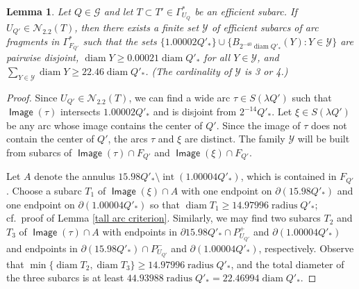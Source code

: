 \documentclass[12pt]{amsart}
\numberwithin{equation}{section}
\theoremstyle{plain}
\newtheorem{lemma}[theorem]{Lemma}
\theoremstyle{definition}
\newcommand{\radius}{\mathop\mathrm{radius}\nolimits}
\newcommand{\diam}{\mathop\mathrm{diam}\nolimits}
\newcommand{\Image}{\mathop\mathsf{Image}\nolimits}
\newcommand{\interior}{\mathop\mathrm{int}\nolimits}
\numberwithin{figure}{section}
\begin{document}
\begin{lemma}\label{N22-geometry} Let $Q\in\mathscr{G}$ and let $T\subset T'\in\Gamma^*_{U_Q}$ be an efficient subarc. If $U_{Q'}\in\mathcal{N}_{2.2}(T)$, then there exists a finite set $\mathcal{Y}$ of efficient subarcs of arc fragments in $\Gamma^*_{F_{Q'}}$ such that the sets $\{1.00002Q'_*\}\cup\{B_{2^{-40}\diam Q'_*}(Y):Y\in\mathcal{Y}\}$ are pairwise disjoint, $\diam Y\geq 0.00021 \diam Q'_*$ for all $Y\in\mathcal{Y}$, and $\sum_{Y\in\mathcal{Y}} \diam Y \geq 22.46\diam Q'_*$. (The cardinality of $\mathcal{Y}$ is 3 or 4.)
\end{lemma}

\begin{proof} Since $U_{Q'}\in\mathcal{N}_{2.2}(T)$, we can find a wide arc $\tau \in S(\lambda Q')$ such that $\Image(\tau)$ intersects $1.00002Q'_*$ and is disjoint from $2^{-14}Q'_*$. Let $\xi\in S(\lambda Q')$ be any arc whose image contains the center of $Q'$. Since the image of $\tau$ does not contain the center of $Q'$, the arcs $\tau$ and $\xi$ are distinct. The family $\mathcal{Y}$ will be built from subarcs of $\Image(\tau)\cap F_{Q'}$ and $\Image(\xi)\cap F_{Q'}$.

Let $A$ denote the annulus $15.98Q'_*\setminus \interior(1.00004Q'_*)$, which is contained in $F_{Q'}$. Choose a subarc $T_1$ of $\Image(\xi)\cap A$ with one endpoint on $\partial(15.98Q'_*)$ and one endpoint on $\partial (1.00004Q'_*)$ so that $\diam T_1\geq 14.97996\radius Q'_*$; cf.~proof of Lemma \ref{tall arc criterion}. Similarly, we may find two subarcs $T_2$ and $T_3$ of $\Image(\tau) \cap A$ with endpoints in $\partial 15.98Q'_* \cap P_{U_{Q'}}^+$ and $\partial(1.00004Q'_*)$ and endpoints in $\partial(15.98Q'_*) \cap P_{U_{Q'}}^-$ and $\partial (1.00004Q'_*)$, respectively. Observe that $\min\{\diam T_2,\diam T_3\}\geq 14.97996\radius Q'_*$, and the total diameter of the three subarcs is at least $44.93988\radius Q'_*=22.46994\diam Q'_*$.


\end{proof}
\end{document}
